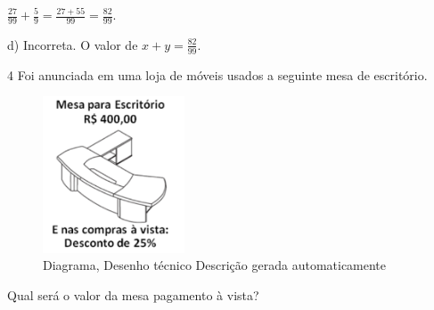 \begin{escolha}
\begin{boxmedio}
\begin{boxmedio}
{\begin{boxpeq}
\begin{boxpeq}
{\begin{boxpeq}
\begin{boxmedio}
\begin{boxmedio}
\begin{boxpeq}
\begin{boxmedio}
\begin{boxpeq}
\begin{boxpeq}
\begin{boxpeq}
\begin{boxpeq}
\begin{boxmedio}
{\begin{boxmedio}
\begin{boxmedio}
\begin{boxpeq}
\begin{boxmedio}
\begin{boxpeq}
\begin{boxpeq}
\begin{boxpeq}
\begin{escolha}
{\begin{boxmedio}
\begin{boxpeq}
\begin{boxpeq}
\begin{boxpeq}
\begin{boxpeq}
\begin{boxpeq}
\begin{boxmedio}
\begin{boxpeq}
\begin{boxpeq}
\begin{boxpeq}
{\begin{boxpeq}
\begin{boxmedio}
\begin{boxpeq}
\begin{boxpeq}
\begin{boxpeq}
{\begin{boxpeq}
\begin{boxmedio}
{\begin{boxpeq}
\begin{boxpeq}
\begin{boxmedio}
\begin{boxmedio}
\begin{boxpeq}
\begin{boxpeq}
{\begin{boxpeq}
\begin{boxpeq}
\begin{boxpeq}
\begin{boxpeq}
\begin{boxpeq}
\begin{escolha}
\begin{escolha}
{\begin{boxmedio}
\begin{boxpeq}
\begin{q°}
\begin{boxmedio}
\begin{boxpeq}
\begin{boxpeq}
\begin{boxmedio}
\begin{boxmedio}
\begin{boxmedio}
\begin{boxmedio}
{\begin{escolha}
\begin{escolha}
\begin{escolha}
\begin{escolha}
\begin{escolha}
\begin{escolha}
{$\frac{27}{99} + \frac{5}{9} = \frac{27 + 55}{99} = \frac{82}{99}$.

d) Incorreta. O valor de $x + y = \frac{82}{99}$.}

\num{4} Foi anunciada em uma loja de móveis usados a seguinte mesa de
escritório.

\begin{figure}
\centering
\includegraphics[width=1.66071in,height=1.8286in]{./_SAEB_9_MAT/media/image262.png}
\caption{Diagrama, Desenho técnico Descrição gerada automaticamente}
\end{figure}


Qual será o valor da mesa pagamento à vista?


\end{escolha}
\end{escolha}
\end{escolha}
\end{escolha}
\end{escolha}
\end{escolha}}
\end{boxmedio}
\end{boxmedio}
\end{boxmedio}
\end{boxmedio}
\end{boxpeq}
\end{boxpeq}
\end{boxmedio}
\end{q°}
\end{boxpeq}
\end{boxmedio}}
\end{escolha}
\end{escolha}
\end{boxpeq}
\end{boxpeq}
\end{boxpeq}
\end{boxpeq}
\end{boxpeq}}
\end{boxpeq}
\end{boxpeq}
\end{boxmedio}
\end{boxmedio}
\end{boxpeq}
\end{boxpeq}}
\end{boxmedio}
\end{boxpeq}}
\end{boxpeq}
\end{boxpeq}
\end{boxpeq}
\end{boxmedio}
\end{boxpeq}}
\end{boxpeq}
\end{boxpeq}
\end{boxpeq}
\end{boxmedio}
\end{boxpeq}
\end{boxpeq}
\end{boxpeq}
\end{boxpeq}
\end{boxpeq}
\end{boxmedio}}
\end{escolha}
\end{boxpeq}
\end{boxpeq}
\end{boxpeq}
\end{boxmedio}
\end{boxpeq}
\end{boxmedio}
\end{boxmedio}}
\end{boxmedio}
\end{boxpeq}
\end{boxpeq}
\end{boxpeq}
\end{boxpeq}
\end{boxmedio}
\end{boxpeq}
\end{boxmedio}
\end{boxmedio}
\end{boxpeq}}
\end{boxpeq}
\end{boxpeq}}
\end{boxmedio}
\end{boxmedio}
\end{escolha}

